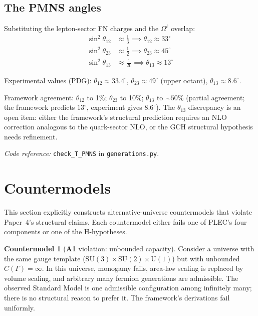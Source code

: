 \documentclass[11pt]{article}
\newcommand{\coderef}[2]{\smallskip\noindent\textit{Code reference:} \texttt{#1} in \texttt{#2}.}
\newcommand{\SU}{\mathrm{SU}}
\newcommand{\Un}{\mathrm{U}}
\newcommand{\Aone}{\textbf{A1}}
\theoremstyle{definition}
\newtheorem{countermodel}[theorem]{Countermodel}
\begin{document}
\subsection{The PMNS angles}\label{sec:PMNS_angles_full}

Substituting the lepton-sector FN charges and the $\Omega^{\ell}$ overlap:
\begin{align*}
\sin^2\theta_{12} &\approx \frac{1}{3} \implies \theta_{12} \approx 33^\circ \\
\sin^2\theta_{23} &\approx \frac{1}{2} \implies \theta_{23} \approx 45^\circ \\
\sin^2\theta_{13} &\approx \frac{1}{20} \implies \theta_{13} \approx 13^\circ
\end{align*}

Experimental values (PDG):
$\theta_{12} \approx 33.4^\circ$, $\theta_{23} \approx 49^\circ$ (upper octant), $\theta_{13} \approx 8.6^\circ$.

Framework agreement: $\theta_{12}$ to 1\%; $\theta_{23}$ to 10\%; $\theta_{13}$ to $\sim 50\%$ (partial agreement; the framework predicts $13^\circ$, experiment gives $8.6^\circ$). The $\theta_{13}$ discrepancy is an open item: either the framework's structural prediction requires an NLO correction analogous to the quark-sector NLO, or the GCH structural hypothesis needs refinement.

\coderef{check\_T\_PMNS}{generations.py}

\clearpage

\section{Countermodels}\label{sec:countermodels}

This section explicitly constructs alternative-universe countermodels that violate Paper~4's structural claims. Each countermodel either fails one of PLEC's four components or one of the H-hypotheses.

\begin{countermodel}[\Aone{} violation: unbounded capacity]\label{cm:unbounded}
Consider a universe with the same gauge template ($\SU(3)\times\SU(2)\times\Un(1)$) but with unbounded $C(\Gamma) = \infty$. In this universe, monogamy fails, area-law scaling is replaced by volume scaling, and arbitrary many fermion generations are admissible. The observed Standard Model is one admissible configuration among infinitely many; there is no structural reason to prefer it. The framework's derivations fail uniformly.
\end{countermodel}
\end{document}
